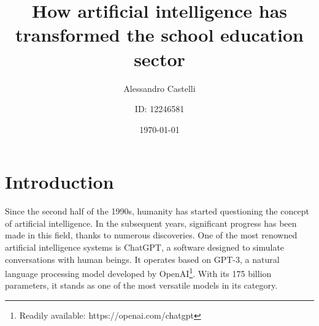\documentclass[a4paper,12pt]{article}
\title{How artificial intelligence has transformed the school education sector}
\author{Alessandro Castelli \and ID: 12246581}
\date{\today}
\begin{document}

\maketitle  %
\thispagestyle{empty}   %
\pagebreak  %

\cftsetpnumwidth{0.5cm} %
\renewcommand{\cftsecdotsep}{4} %
\tableofcontents    %


\setcounter{page}{1}    %
\newpage    %

\section{Introduction}  %
Since the second half of the 1990s, humanity has started questioning the concept of artificial intelligence. In the subsequent years, significant progress has been made in this field, thanks to numerous discoveries. One of the most renowned artificial intelligence systems is ChatGPT, a software designed to simulate conversations with human beings. It operates based on GPT-3, a natural language processing model developed by OpenAI\footnote{Readily available: https://openai.com/chatgpt}. With its 175 billion parameters, it stands as one of the most versatile models in its category.

\end{document}
